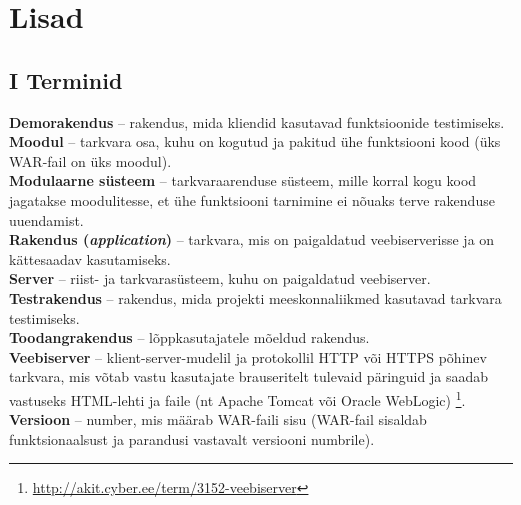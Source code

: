 \documentclass[12pt]{article}
\begin{document}
  \newpage
  
  \section*{Lisad}
  \label{lisad}
  
  \subsection*{I Terminid}
  \label{terms}
  
  \textbf{Demorakendus} \--- rakendus, mida kliendid kasutavad funktsioonide testimiseks.\\
  
  \textbf{Moodul} \--- tarkvara osa, kuhu on kogutud ja pakitud ühe funktsiooni kood (üks WAR\--fail on üks moodul).\\
  
  \textbf{Modulaarne süsteem} \--- tarkvaraarenduse süsteem, mille korral kogu kood jagatakse moodulitesse, et ühe funktsiooni tarnimine ei nõuaks terve rakenduse uuendamist.\\
  
  \textbf{Rakendus (\textit{application})} \--- tarkvara, mis on paigaldatud veebiserverisse ja on kättesaadav kasutamiseks.\\
  
  \textbf{Server} \--- riist- ja tarkvarasüsteem, kuhu on paigaldatud veebiserver.\\
  
  \textbf{Testrakendus} \--- rakendus, mida projekti meeskonnaliikmed kasutavad tarkvara testimiseks.\\
   
  \textbf{Toodangrakendus} \--- lõppkasutajatele mõeldud rakendus.\\
  
  \textbf{Veebiserver} \--- klient-server-mudelil ja protokollil HTTP või HTTPS põhinev tarkvara, mis võtab vastu kasutajate brauseritelt tulevaid päringuid ja saadab vastuseks HTML-lehti ja faile (nt Apache Tomcat või Oracle WebLogic) \footnote{\url{http://akit.cyber.ee/term/3152-veebiserver}}.\\
  
  \textbf{Versioon} \--- number, mis määrab WAR\--faili sisu (WAR\--fail sisaldab funktsionaalsust ja parandusi vastavalt versiooni numbrile).\\
  
\end{document}
